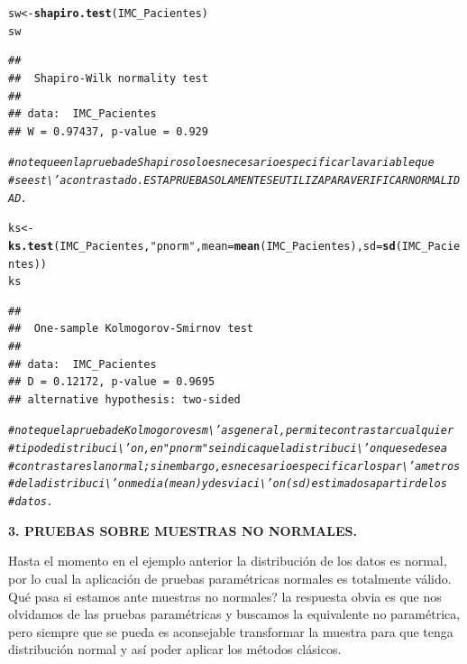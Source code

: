 \documentclass[12pt,letterpaper]{article}\usepackage[]{graphicx}\usepackage[]{color}
\makeatletter
\newcommand{\hlstr}[1]{\textcolor[rgb]{0.192,0.494,0.8}{#1}}%
\newcommand{\hlcom}[1]{\textcolor[rgb]{0.678,0.584,0.686}{\textit{#1}}}%
\newcommand{\hlstd}[1]{\textcolor[rgb]{0.345,0.345,0.345}{#1}}%
\newcommand{\hlkwb}[1]{\textcolor[rgb]{0.69,0.353,0.396}{#1}}%
\newcommand{\hlkwc}[1]{\textcolor[rgb]{0.333,0.667,0.333}{#1}}%
\newcommand{\hlkwd}[1]{\textcolor[rgb]{0.737,0.353,0.396}{\textbf{#1}}}%
\newenvironment{kframe}{%
 \def\at@end@of@kframe{}%
 \ifinner\ifhmode%
  \def\at@end@of@kframe{\end{minipage}}%
  \begin{minipage}{\columnwidth}%
 \fi\fi%
 \def\FrameCommand##1{\hskip\@totalleftmargin \hskip-\fboxsep
 \colorbox{shadecolor}{##1}\hskip-\fboxsep
     \hskip-\linewidth \hskip-\@totalleftmargin \hskip\columnwidth}%
 \MakeFramed {\advance\hsize-\width
   \@totalleftmargin\z@ \linewidth\hsize
   \@setminipage}}%
 {\par\unskip\endMakeFramed%
 \at@end@of@kframe}
\newenvironment{knitrout}{}{} %
\makeatother
\begin{document}
\begin{knitrout}
\begin{kframe}
\begin{alltt}
\hlstd{sw} \hlkwb{<-} \hlkwd{shapiro.test}\hlstd{(IMC_Pacientes)}
\hlstd{sw}
\end{alltt}
\begin{verbatim}
## 
## 	Shapiro-Wilk normality test
## 
## data:  IMC_Pacientes
## W = 0.97437, p-value = 0.929
\end{verbatim}
\begin{alltt}
\hlcom{# note que en la prueba de Shapiro solo es necesario especificar la variable que }
\hlcom{# se est\textbackslash{}'a contrastado. ESTA PRUEBA SOLAMENTE SEUTILIZA PARA VERIFICAR NORMALIDAD. }

\hlstd{ks} \hlkwb{<-} \hlkwd{ks.test}\hlstd{(IMC_Pacientes,}\hlstr{"pnorm"}\hlstd{,}\hlkwc{mean}\hlstd{=}\hlkwd{mean}\hlstd{(IMC_Pacientes),}\hlkwc{sd}\hlstd{=}\hlkwd{sd}\hlstd{(IMC_Pacientes))}
\hlstd{ks}
\end{alltt}
\begin{verbatim}
## 
## 	One-sample Kolmogorov-Smirnov test
## 
## data:  IMC_Pacientes
## D = 0.12172, p-value = 0.9695
## alternative hypothesis: two-sided
\end{verbatim}
\begin{alltt}
\hlcom{# note que la prueba de Kolmogorov es m\textbackslash{}'as general, permite contrastar cualquier }
\hlcom{# tipo de distribuci\textbackslash{}'on, en "pnorm" se indicaque la distribuci\textbackslash{}'on que se desea }
\hlcom{# contrastar es la normal; sin embargo, es necesario especificar los par\textbackslash{}'ametros }
\hlcom{# de la distribuci\textbackslash{}'on media (mean) y desviaci\textbackslash{}'on (sd) estimados a partir de los }
\hlcom{# datos.}
\end{alltt}
\end{kframe}
\end{knitrout}

\begin{center}
\textbf{3.  PRUEBAS SOBRE MUESTRAS NO NORMALES.}
\end{center}

Hasta el momento en el ejemplo anterior la distribuci\'on de los datos es normal, por lo cual la aplicaci\'on de pruebas param\'etricas normales es totalmente v\'alido. \¿Qu\'e pasa si estamos ante muestras no normales? la respuesta obvia es que nos olvidamos de las pruebas param\'etricas y buscamos la equivalente no param\'etrica, pero siempre que se pueda es aconsejable transformar la muestra para que tenga distribuci\'on normal y as\'i poder aplicar los m\'etodos cl\'asicos.\\
\end{document}
